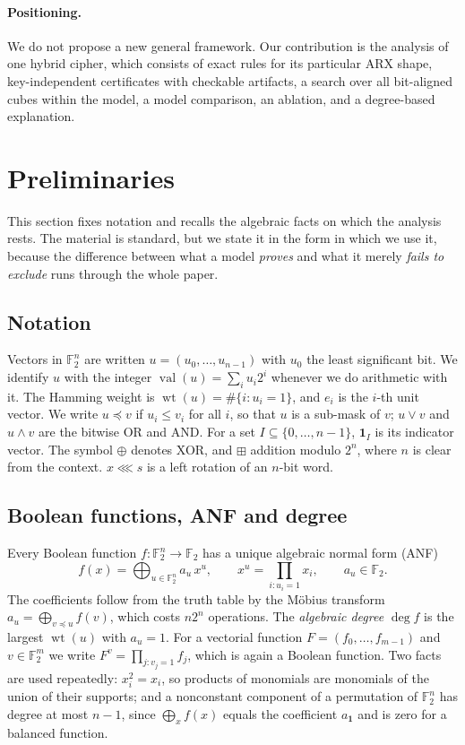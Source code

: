 \documentclass[11pt,a4paper]{article}
\theoremstyle{definition}
\theoremstyle{remark}
\newcommand{\add}{\boxplus}
\newcommand{\F}{\mathbb{F}_2}
\newcommand{\val}{\operatorname{val}}
\newcommand{\wt}{\operatorname{wt}}
\begin{document}
\paragraph{Positioning.} We do not propose a new general framework. Our contribution is the analysis of one hybrid cipher, which consists of exact rules for its particular ARX shape, key-independent certificates with checkable artifacts, a search over all bit-aligned cubes within the model, a model comparison, an ablation, and a degree-based explanation.

\section{Preliminaries}\label{sec:prelim}

This section fixes notation and recalls the algebraic facts on which the analysis rests. The material is standard, but we state it in the form in which we use it, because the difference between what a model \emph{proves} and what it merely \emph{fails to exclude} runs through the whole paper.

\subsection{Notation}
Vectors in $\F^n$ are written $u=(u_0,\dots,u_{n-1})$ with $u_0$ the least significant bit. We identify $u$ with the integer $\val(u)=\sum_i u_i2^i$ whenever we do arithmetic with it. The Hamming weight is $\wt(u)=\#\{i:u_i=1\}$, and $e_i$ is the $i$-th unit vector. We write $u\preceq v$ if $u_i\le v_i$ for all $i$, so that $u$ is a sub-mask of $v$; $u\vee v$ and $u\wedge v$ are the bitwise OR and AND. For a set $I\subseteq\{0,\dots,n-1\}$, $\mathbf 1_I$ is its indicator vector. The symbol $\oplus$ denotes XOR, and $\add$ addition modulo $2^n$, where $n$ is clear from the context. $x\lll s$ is a left rotation of an $n$-bit word.

\subsection{Boolean functions, ANF and degree}
Every Boolean function $f:\F^n\to\F$ has a unique algebraic normal form (ANF)
\[
f(x)=\bigoplus_{u\in\F^n} a_u\,x^u,\qquad x^u=\prod_{i:u_i=1}x_i,\qquad a_u\in\F .
\]
The coefficients follow from the truth table by the Möbius transform $a_u=\bigoplus_{v\preceq u}f(v)$, which costs $n2^n$ operations. The \emph{algebraic degree} $\deg f$ is the largest $\wt(u)$ with $a_u=1$. For a vectorial function $F=(f_0,\dots,f_{m-1})$ and $v\in\F^m$ we write $F^v=\prod_{j:v_j=1}f_j$, which is again a Boolean function. Two facts are used repeatedly: $x_i^2=x_i$, so products of monomials are monomials of the union of their supports; and a nonconstant component of a permutation of $\F^n$ has degree at most $n-1$, since $\bigoplus_x f(x)$ equals the coefficient $a_{\mathbf 1}$ and is zero for a balanced function.
\end{document}
